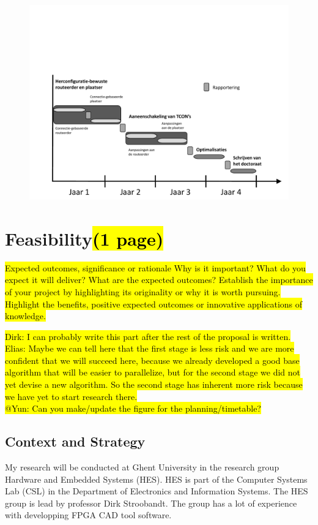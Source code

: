 \documentclass[a4paper,oneside,12pt]{article}
\begin{document}
\begin{figure}[ht]
\centering
\includegraphics[width = \textwidth,trim = 0mm 0mm 0mm 70mm, clip]{tijdschema.pdf}
\end{figure}

\newpage
\section{Feasibility\hl{(1 page)}}
\hl{Expected outcomes, significance or rationale
Why is it important? 
What do you expect it will deliver? 
What are the expected outcomes? 
Establish the importance of your project by highlighting its originality or why it is worth pursuing. Highlight the benefits, positive expected outcomes or innovative applications of knowledge.}

\hl{Dirk: I can probably write this part after the rest of the proposal is written.\\
Elias: Maybe we can tell here that the first stage is less risk and we are more confident that we will succeed here, because we already developed a good base algorithm that will be easier to parallelize, but for the second stage we did not yet devise a new algorithm. So the second stage has inherent more risk because we have yet to start research there.\\
@Yun: Can you make/update the figure for the planning/timetable?}


\subsection{Context and Strategy}\label{context}
My research will be conducted at Ghent University in the research group Hardware and Embedded Systems (HES). HES is part of the Computer Systems Lab (CSL) in the Department of Electronics and Information Systems. The HES group is lead by professor Dirk Stroobandt. The group has a lot of experience with developping FPGA CAD tool software.
\end{document}
